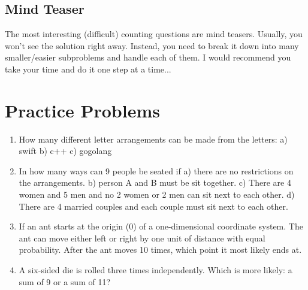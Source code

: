 \documentclass[11pt]{article}
\begin{document}
\subsection{Mind Teaser}
The most interesting (difficult) counting questions are mind teasers. 
Usually, you won't see the solution right away. Instead, you need to break it down into many smaller/easier subproblems and handle each of them.
I would recommend you take your time and do it one step at a time...

\section{Practice Problems}
\begin{enumerate}
  \item How many different letter arrangements can be made from the letters: a) swift b) c++ c) gogolang
  \item In how many ways can 9 people be seated if a) there are no restrictions on the arrangements. b) person A and B must be sit together. c) There are 4 women and 5 men and no 2 women or 2 men can sit next to each other. d) There are 4 married couples and each couple must sit next to each other.
  \item If an ant starts at the origin (0) of a one-dimensional coordinate system. The ant can move either left or right by one unit of distance with equal probability. After the ant moves 10 times, which point it most likely ends at.
  \item A six-sided die is rolled three times independently. Which is more likely: a sum of 9 or a sum of 11?
\end{enumerate}
\end{document}

